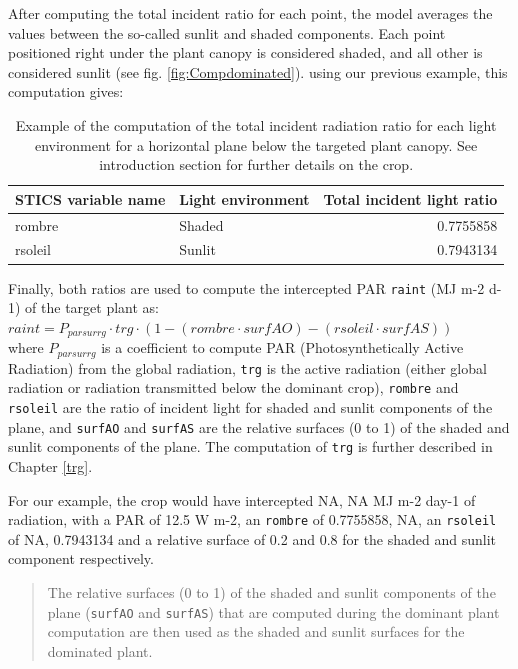 \documentclass[]{book}
\theoremstyle{definition}
\theoremstyle{definition}
\theoremstyle{definition}
\theoremstyle{remark}
\begin{document}
After computing the total incident ratio for each point, the model
averages the values between the so-called sunlit and shaded components.
Each point positioned right under the plant canopy is considered shaded,
and all other is considered sunlit (see fig. \ref{fig:Compdominated}).
using our previous example, this computation gives:

\begin{table}

\caption{\label{tab:unnamed-chunk-6}Example of the computation of the total incident radiation ratio for each light environment for a horizontal plane below the targeted plant canopy. See introduction section for further details on the crop.}
\centering
\begin{tabular}[t]{l|l|r}
\hline
STICS variable name & Light environment & Total incident light ratio\\
\hline
rombre & Shaded & 0.7755858\\
\hline
rsoleil & Sunlit & 0.7943134\\
\hline
\end{tabular}
\end{table}

Finally, both ratios are used to compute the intercepted PAR
\texttt{raint} (MJ m-2 d-1) of the target plant as:\\
\(raint=P_{parsurrg}\cdot trg\cdot(1-(rombre\cdot surfAO)-(rsoleil\cdot surfAS))\)\\
where \(P_{parsurrg}\) is a coefficient to compute PAR
(Photosynthetically Active Radiation) from the global radiation,
\texttt{trg} is the active radiation (either global radiation or
radiation transmitted below the dominant crop), \texttt{rombre} and
\texttt{rsoleil} are the ratio of incident light for shaded and sunlit
components of the plane, and \texttt{surfAO} and \texttt{surfAS} are the
relative surfaces (0 to 1) of the shaded and sunlit components of the
plane. The computation of \texttt{trg} is further described in Chapter
\ref{trg}.

For our example, the crop would have intercepted NA, NA MJ m-2 day-1 of
radiation, with a PAR of 12.5 W m-2, an \texttt{rombre} of 0.7755858,
NA, an \texttt{rsoleil} of NA, 0.7943134 and a relative surface of 0.2
and 0.8 for the shaded and sunlit component respectively.

\begin{quote}
The relative surfaces (0 to 1) of the shaded and sunlit components of
the plane (\texttt{surfAO} and \texttt{surfAS}) that are computed during
the dominant plant computation are then used as the shaded and sunlit
surfaces for the dominated plant.
\end{quote}
\end{document}
